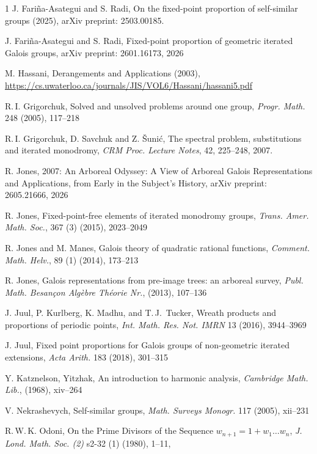 \documentclass{amsart}
\begin{document}
\begin{thebibliography}{1}
J. Fariña-Asategui and S. Radi, On the fixed-point proportion of self-similar groups (2025), arXiv preprint: 2503.00185.

J. Fariña-Asategui and S. Radi, Fixed-point proportion of geometric iterated Galois groups, arXiv preprint: 2601.16173, 2026

M. Hassani, Derangements and Applications (2003), \\ \url{https://cs.uwaterloo.ca/journals/JIS/VOL6/Hassani/hassani5.pdf}


R.\,I. Grigorchuk, Solved and unsolved problems around one group, \textit{Progr. Math.} 248 (2005), 117--218

R.\,I. Grigorchuk, D. Savchuk and Z. Šunić, The spectral problem, substitutions and iterated monodromy, \textit{CRM Proc. Lecture Notes}, 42, 225--248, 2007.

R. Jones, 2007: An Arboreal Odyssey: A View of Arboreal Galois Representations and Applications, from Early in the Subject's History, arXiv preprint: 2605.21666, 2026

R. Jones, Fixed-point-free elements of iterated monodromy groups, \textit{Trans. Amer. Math. Soc.}, 367 (3) (2015), 2023--2049

R. Jones and M. Manes, Galois theory of quadratic rational functions, \textit{Comment. Math. Helv.}, 89 (1) (2014), 173--213

R. Jones, Galois representations from pre-image trees: an arboreal survey, \textit{Publ. Math. Besan\c con Alg\`ebre Th\'eorie Nr.}, (2013), 107--136

J. Juul, P. Kurlberg, K. Madhu, and T.\,J.\ Tucker, Wreath products and proportions of periodic points, \textit{Int. Math. Res. Not. IMRN} 13 (2016), 3944--3969

J. Juul, Fixed point proportions for {G}alois groups of non-geometric iterated extensions, \textit{Acta Arith.} 183 (2018), 301--315

Y. Katznelson, Yitzhak, An introduction to harmonic analysis, \textit{Cambridge Math. Lib.}, (1968), xiv--264

V. Nekrashevych, Self-similar groups, \textit{Math. Surveys Monogr.} 117 (2005), xii--231

R.\,W.\,K. Odoni, On the Prime Divisors of the Sequence $w_{n+1} = 1 + w_1 \dots w_n$, \textit{J. Lond. Math. Soc. (2)} s2-32 (1) (1980), 1--11,



\end{thebibliography}
\end{document}

